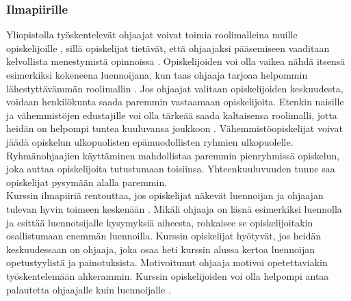 \documentclass[finnish]{tktltiki2}
\theoremstyle{definition}
\theoremstyle{remark}
\begin{document}
\subsubsection{Ilmapiirille}
Yliopistolla työskentelevät ohjaajat voivat toimia roolimalleina muille opiskelijoille \cite{Roberts95, Tashakkori05}, sillä opiskelijat tietävät, että ohjaajaksi pääsemiseen vaaditaan kelvollista menestymistä opinnoissa \cite{Bernstein}. Opiskelijoiden voi olla vaikea nähdä itsensä esimerkiksi kokeneena luennoijana, kun taas ohjaaja tarjoaa helpommin lähestyttävämmän roolimallin \cite{Roberts02}. Jos ohjaajat valitaan opiskelijoiden keskuudesta, voidaan henkilökunta saada paremmin vastaamaan opiskelijoita. Etenkin naisille ja vähemmistöjen edustajille voi olla tärkeää saada kaltaisensa roolimalli, jotta heidän on helpompi tuntea kuuluvansa joukkoon \cite{Morgan02}. Vähemmistöopiskelijat voivat jäädä opiskelun ulkopuolisten epämuodollisten ryhmien ulkopuolelle. Ryhmänohjaajien käyttäminen mahdollistaa paremmin pienryhmissä opiskelun, joka auttaa opiskelijoita tutustumaan toisiinsa. Yhteenkuuluvuuden tunne saa opiskelijat pysymään alalla paremmin.
\\
Kurssin ilmapiiriä rentouttaa, jos opiskelijat näkevät luennoijan ja ohjaajan tulevan hyvin toimeen keskenään \cite{Dickson11}. Mikäli ohjaaja on läsnä esimerkiksi luennolla ja esittää luennotsijalle kysymyksiä aiheesta, rohkaisee se opiskelijoitakin osallistumaan enemmän luennoilla. Kurssin opiskelijat hyötyvät, jos heidän keskuudessaan on ohjaaja, joka osaa heti kurssin alussa kertoa luennoijan opetustyylistä ja painotuksista. Motivoitunut ohjaaja motivoi opetettaviakin työskentelemään ahkerammin. Kurssin opiskelijoiden voi olla helpompi antaa palautetta ohjaajalle kuin luennoijalle \cite{Morgan02}.
\end{document}
